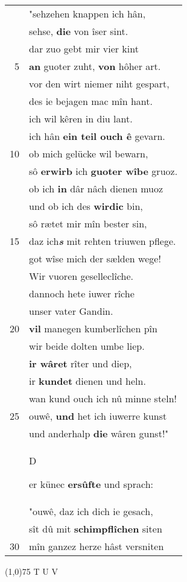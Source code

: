 \documentclass[8pt,a4paper,notitlepage]{article}
\begin{document}
\begin{table}[ht]
\begin{minipage}[t]{0.5\linewidth}
\begin{tabular}{rl}
 & "sehzehen knappen ich hân,\\ 
 & sehse, \textbf{die} von îser sint.\\ 
 & dar zuo gebt mir vier kint\\ 
5 & \textbf{an} guoter zuht, \textbf{von} hôher art.\\ 
 & vor den wirt niemer niht gespart,\\ 
 & des ie bejagen mac mîn hant.\\ 
 & ich wil kêren in diu lant.\\ 
 & ich hân \textbf{ein teil ouch ê} gevarn.\\ 
10 & ob mich gelücke wil bewarn,\\ 
 & sô \textbf{erwirb} ich \textbf{guoter wîbe} gruoz.\\ 
 & ob ich \textbf{in} dâr nâch dienen muoz\\ 
 & und ob ich des \textbf{wirdic} bin,\\ 
 & sô rætet mir mîn bester sin,\\ 
15 & daz ich\textit{\textbf{s}} mit rehten triuwen pflege.\\ 
 & got wîse mich der sælden wege!\\ 
 & Wir vuoren geselleclîche.\\ 
 & dannoch hete iuwer rîche\\ 
 & unser vater Gandin.\\ 
20 & \textbf{vil} manegen kumberlîchen pîn\\ 
 & wir beide dolten umbe liep.\\ 
 & \textbf{ir wâret} rîter und diep,\\ 
 & ir \textbf{kundet} dienen und heln.\\ 
 & wan kund ouch ich nû minne steln!\\ 
25 & ouwê, \textbf{und} het ich iuwerre kunst\\ 
 & und anderhalp \textbf{die} wâren gunst!"\\ 
 & \begin{large}D\end{large}er künec \textbf{ersûfte} und sprach:\\ 
 & "ouwê, daz ich dich ie gesach,\\ 
 & sît dû mit \textbf{schimpflîchen} siten\\ 
30 & mîn ganzez herze hâst versniten\\ 
\end{tabular}
\scriptsize
\line(1,0){75} \newline
T U V \newline

\end{minipage}
\end{table}
\end{document}
